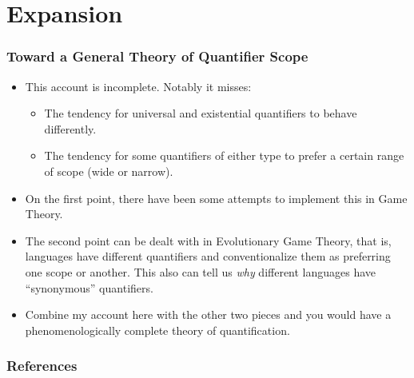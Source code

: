 \documentclass[aspectratio=169]{beamer}
\begin{document}
\section{Expansion}

\begin{frame}
	\frametitle{Toward a General Theory of Quantifier Scope}\pause

	\begin{itemize}
		\item This account is incomplete. Notably it misses:\pause
			\begin{itemize}
				\item The tendency for universal and existential quantifiers to behave differently.\pause
				\item The tendency for some quantifiers of either type to prefer a certain range of scope (wide or narrow).\pause
			\end{itemize}
		\item On the first point, there have been some attempts \parencite{clark12} to implement this in Game Theory.\pause
		\item The second point can be dealt with in Evolutionary Game Theory, that is, languages have different quantifiers and conventionalize them as preferring one scope or another. This also can tell us \emph{why} different languages have ``synonymous'' quantifiers.\pause
		\item Combine my account here with the other two pieces and you would have a phenomenologically complete theory of quantification.
	\end{itemize}
\end{frame}

\begin{frame}
\frametitle{References}
\printbibliography
\end{frame}
\end{document}
